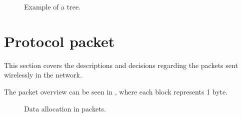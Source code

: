 \begin{figure}[!h]
	\centering
	\caption{Example of a tree.}
	\label{fig:prottree1}
\end{figure}








\section{Protocol packet}
This section covers the descriptions and decisions regarding the packets sent wirelessly in the network.

The packet overview can be seen in , where each block represents 1 byte.
\begin{figure}[h!]
	\centering
	\caption{Data allocation in packets.}
	\label{fig:dataalloc}
\end{figure}


